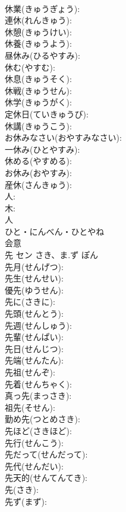 \documentclass[8pt]{extreport}
\begin{document}
\begin{CJK}{UTF8}{min}
\\	休業(きゅうぎょう): 
\\	連休(れんきゅう): 
\\	休憩(きゅうけい): 
\\	休養(きゅうよう): 
\\	昼休み(ひるやすみ): 
\\	休む(やすむ): 
\\	休息(きゅうそく): 
\\	休戦(きゅうせん): 
\\	休学(きゅうがく): 
\\	定休日(ていきゅうび): 
\\	休講(きゅうこう): 
\\	お休みなさい(おやすみなさい): 
\\	一休み(ひとやすみ): 
\\	休める(やすめる): 
\\	お休み(おやすみ): 
\\	産休(さんきゅう): 
\\	人: 
\\	木: 
\\	人	
\\	ひと・にんべん・ひとやね	
\\	会意 
\\	先	セン	さき、ま.ず	ぽん	
\\	先月(せんげつ): 
\\	先生(せんせい): 
\\	優先(ゆうせん): 
\\	先に(さきに): 
\\	先頭(せんとう): 
\\	先週(せんしゅう): 
\\	先輩(せんぱい): 
\\	先日(せんじつ): 
\\	先端(せんたん): 
\\	先祖(せんぞ): 
\\	先着(せんちゃく): 
\\	真っ先(まっさき): 
\\	祖先(そせん): 
\\	勤め先(つとめさき): 
\\	先ほど(さきほど): 
\\	先行(せんこう): 
\\	先だって(せんだって): 
\\	先代(せんだい): 
\\	先天的(せんてんてき): 
\\	先(さき): 
\\	先ず(まず): 

\end{CJK}
\end{document}

